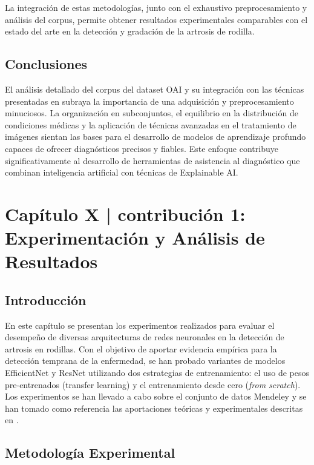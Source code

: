 \documentclass[11pt,spanish,listoffigures,listoftables]{tfgetsinf}
\begin{document}
La integración de estas metodologías, junto con el exhaustivo preprocesamiento y análisis del corpus, permite obtener resultados experimentales comparables con el estado del arte en la detección y gradación de la artrosis de rodilla.

\section{Conclusiones}
El análisis detallado del corpus del dataset OAI y su integración con las técnicas presentadas en \cite{efficientnet_paper} subraya la importancia de una adquisición y preprocesamiento minuciosos. La organización en subconjuntos, el equilibrio en la distribución de condiciones médicas y la aplicación de técnicas avanzadas en el tratamiento de imágenes sientan las bases para el desarrollo de modelos de aprendizaje profundo capaces de ofrecer diagnósticos precisos y fiables. Este enfoque contribuye significativamente al desarrollo de herramientas de asistencia al diagnóstico que combinan inteligencia artificial con técnicas de Explainable AI.



\chapter{Capítulo X | contribución 1: Experimentación y Análisis de Resultados}

\section{Introducción}
En este capítulo se presentan los experimentos realizados para evaluar el desempeño de diversas arquitecturas de redes neuronales en la detección de artrosis en rodillas. Con el objetivo de aportar evidencia empírica para la detección temprana de la enfermedad, se han probado variantes de modelos EfficientNet y ResNet utilizando dos estrategias de entrenamiento: el uso de pesos pre-entrenados (transfer learning) y el entrenamiento desde cero (\textit{from scratch}). Los experimentos se han llevado a cabo sobre el conjunto de datos Mendeley \cite{chen2018knee} y se han tomado como referencia las aportaciones teóricas y experimentales descritas en \cite{efficientnet_paper}. 

\section{Metodología Experimental}
\end{document}
